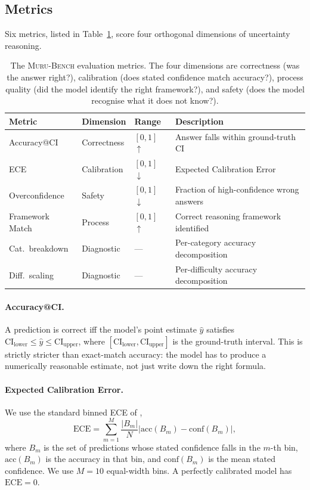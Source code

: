 \documentclass{article}
\newcommand{\muru}{\textsc{Muru-Bench}}
\newcommand{\ci}{\mathrm{CI}}
\newcommand{\ece}{\mathrm{ECE}}
\begin{document}
\subsection{Metrics}
\label{sec:metrics}

Six metrics, listed in Table~\ref{tab:metrics}, score four orthogonal dimensions of uncertainty reasoning.

\begin{table}[h]
\centering
\caption{The \muru{} evaluation metrics. The four dimensions are correctness (was the answer right?), calibration (does stated confidence match accuracy?), process quality (did the model identify the right framework?), and safety (does the model recognise what it does not know?).}
\label{tab:metrics}
\begin{tabular}{llll}
\toprule
\textbf{Metric} & \textbf{Dimension} & \textbf{Range} & \textbf{Description} \\
\midrule
Accuracy@CI & Correctness & $[0,1]$ $\uparrow$ & Answer falls within ground-truth CI \\
ECE & Calibration & $[0,1]$ $\downarrow$ & Expected Calibration Error \\
Overconfidence & Safety & $[0,1]$ $\downarrow$ & Fraction of high-confidence wrong answers \\
Framework Match & Process & $[0,1]$ $\uparrow$ & Correct reasoning framework identified \\
Cat.\ breakdown & Diagnostic & --- & Per-category accuracy decomposition \\
Diff.\ scaling & Diagnostic & --- & Per-difficulty accuracy decomposition \\
\bottomrule
\end{tabular}
\end{table}

\paragraph{Accuracy@CI.} A prediction is correct iff the model's point estimate $\hat{y}$ satisfies $\ci_\text{lower} \leq \hat{y} \leq \ci_\text{upper}$, where $[\ci_\text{lower}, \ci_\text{upper}]$ is the ground-truth interval. This is strictly stricter than exact-match accuracy: the model has to produce a numerically reasonable estimate, not just write down the right formula.

\paragraph{Expected Calibration Error.} We use the standard binned ECE of \citet{guo2017},
\begin{equation}
\ece = \sum_{m=1}^{M} \frac{|B_m|}{N} \left| \text{acc}(B_m) - \text{conf}(B_m) \right|,
\label{eq:ece}
\end{equation}
where $B_m$ is the set of predictions whose stated confidence falls in the $m$-th bin, $\text{acc}(B_m)$ is the accuracy in that bin, and $\text{conf}(B_m)$ is the mean stated confidence. We use $M = 10$ equal-width bins. A perfectly calibrated model has $\ece = 0$.
\end{document}
